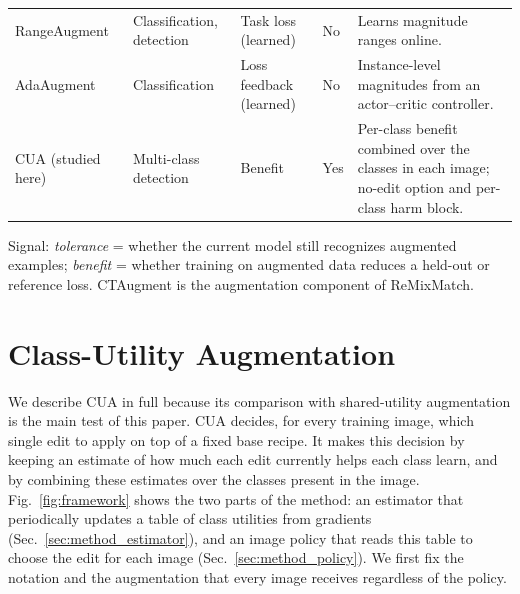 \documentclass[conference]{IEEEtran}
\begin{document}
\begin{table}[t]
\begin{tabularx}{\textwidth}{@{}p{}p{}p{}p{}Y@{}}
RangeAugment~\cite{mehta2022rangeaugment} & Classification, detection & Task loss (learned) & No & Learns magnitude ranges online. \\
AdaAugment~\cite{yang2025adaaugment} & Classification & Loss feedback (learned) & No & Instance-level magnitudes from an actor--critic controller. \\
\midrule
CUA (studied here) & Multi-class detection & Benefit & Yes & Per-class benefit combined over the classes in each image; no-edit option and per-class harm block. \\
\bottomrule
\end{tabularx}
\vspace{3pt}
\begin{minipage}{\textwidth}
\footnotesize
Signal: \emph{tolerance} = whether the current model still recognizes augmented examples; \emph{benefit} = whether training on augmented data reduces a held-out or reference loss. CTAugment is the augmentation component of ReMixMatch.
\end{minipage}
\end{table}

\section{Class-Utility Augmentation}
\label{sec:method}

We describe CUA in full because its comparison with shared-utility augmentation is the main test of this paper. CUA decides, for every training image, which single edit to apply on top of a fixed base recipe. It makes this decision by keeping an estimate of how much each edit currently helps each class learn, and by combining these estimates over the classes present in the image. Fig.~\ref{fig:framework} shows the two parts of the method: an estimator that periodically updates a table of class utilities from gradients (Sec.~\ref{sec:method_estimator}), and an image policy that reads this table to choose the edit for each image (Sec.~\ref{sec:method_policy}). We first fix the notation and the augmentation that every image receives regardless of the policy.
\end{document}
